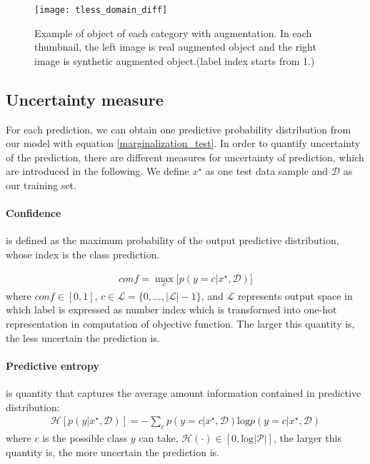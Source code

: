 \begin{figure}[H]
		\centering
		\texttt{[image: tless\_domain\_diff]}
		\caption{Example of object of each category with augmentation. In each thumbnail, the left image is real augmented object and the right image is synthetic augmented object.(label index starts from 1.)}		
		\label{fig:tless_aug}
\end{figure} 


\subsection{Uncertainty measure}
For each prediction, we can obtain one predictive probability distribution from our model with equation \ref{marginalization_test}. In order to quantify uncertainty of the prediction, there are different measures for uncertainty of prediction, which are introduced in the following. We define $x^\star$ as one test data sample and $\mathcal D$ as our training set. 
\paragraph{Confidence} is defined as the maximum probability of the output predictive distribution, whose index is the class prediction.

\begin{equation}\label{confidence}	
\begin{aligned}
conf = \max_c \big[ p(y=c|x^\star, \mathcal D) \big]
\end{aligned}
\end{equation}
where $conf \in [0,1]$, $c \in \mathcal L = \{0,...,|\mathcal L|-1\}$, and $\mathcal L$ represents output space in which label is expressed as number index which is transformed into one-hot representation in computation of objective function. The larger this quantity is, the less uncertain the prediction is. 

\paragraph{Predictive entropy} is quantity that captures the average amount information contained in predictive distribution\cite{shannon1948mathematical}: 
\begin{equation}\label{entropy}	
\begin{aligned}
\mathcal H[p(y|x^\star, \mathcal D)] = -\sum_{c}p(y=c|x^\star, \mathcal D)\text{log}p(y=c|x^\star, \mathcal D)
\end{aligned}
\end{equation}
where $c$ is the possible class $y$ can take, $\mathcal H(\cdot) \in [0, \text{log}{|\mathcal P|}]$, the larger this quantity is, the more uncertain the prediction is.

